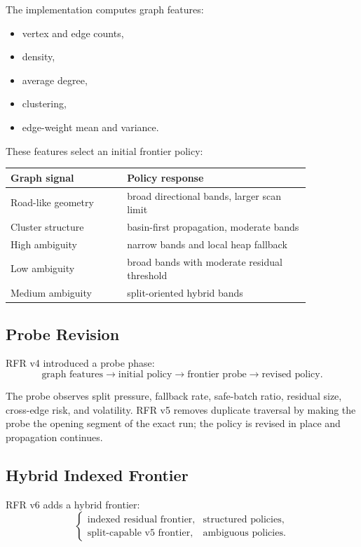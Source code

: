 \documentclass[11pt]{article}
\begin{document}
The implementation computes graph features:

\begin{itemize}
  \item vertex and edge counts,
  \item density,
  \item average degree,
  \item clustering,
  \item edge-weight mean and variance.
\end{itemize}

These features select an initial frontier policy:

\begin{center}
\begin{tabular}{p{0.33\linewidth}p{0.52\linewidth}}
\toprule
Graph signal & Policy response \\
\midrule
Road-like geometry & broad directional bands, larger scan limit \\
Cluster structure & basin-first propagation, moderate bands \\
High ambiguity & narrow bands and local heap fallback \\
Low ambiguity & broad bands with moderate residual threshold \\
Medium ambiguity & split-oriented hybrid bands \\
\bottomrule
\end{tabular}
\end{center}

\subsection{Probe Revision}

RFR v4 introduced a probe phase:
\[
  \text{graph features} \rightarrow \text{initial policy}
  \rightarrow \text{frontier probe}
  \rightarrow \text{revised policy}.
\]

The probe observes split pressure, fallback rate, safe-batch ratio, residual size, cross-edge risk, and volatility. RFR v5 removes duplicate traversal by making the probe the opening segment of the exact run; the policy is revised in place and propagation continues.

\subsection{Hybrid Indexed Frontier}

RFR v6 adds a hybrid frontier:
\[
  \begin{cases}
    \text{indexed residual frontier}, & \text{structured policies},\\
    \text{split-capable v5 frontier}, & \text{ambiguous policies}.
  \end{cases}
\]
\end{document}
